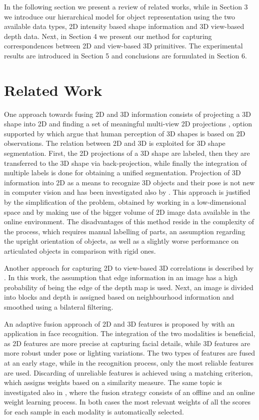 \documentclass[runningheads]{llncs}
\begin{document}
In the following section we present a review of related works, while in Section 3 we introduce our hierarchical model for object representation using the two available data types, 2D intensity based shape information and 3D view-based depth data. Next, in Section 4 we present our method for capturing correspondences between 2D and view-based 3D primitives. The experimental results are introduced in Section 5 and conclusions are formulated in Section 6.

\section{Related Work}
\label{sec:related_work}  

One approach towards fusing 2D and 3D information consists of projecting a 3D shape into 2D and finding a set of meaningful multi-view 2D projections \cite{WangGWC0C13}, option supported by \cite{Fleming2009} which argue that human perception of 3D shapes is based on 2D observations. The relation between 2D and 3D is exploited for 3D shape segmentation. First, the 2D projections of a 3D shape are labeled, then they are transferred to the 3D shape via back-projection, while finally the integration of multiple labels is done for obtaining a unified segmentation. Projection of 3D information into 2D as a means to recognize 3D objects and their pose is not new in computer vision and has been investigated also by \cite{Cyr2001}. This approach is justified by the simplification of the problem, obtained by working in a low-dimensional space and by making use of the bigger volume of 2D image data available in the online environment. The disadvantages of this method reside in the complexity of the process, which requires manual labelling of parts, an assumption regarding the upright orientation of objects, as well as a slightly worse performance on articulated objects in comparison with rigid ones.

Another approach for capturing 2D to view-based 3D correlations is described by \cite{Cheng2010}. In this work, the assumption that edge information in an image has a high probability of being the edge of the depth map is used. Next, an image is divided into blocks and depth is assigned based on neighbourhood information and smoothed using a bilateral filtering. 

An adaptive fusion approach of 2D and 3D features is proposed by \cite{Arca2007} with an application in face recognition. The integration of the two modalities is beneficial, as 2D features are more precise at capturing facial details, while 3D features are more robust under pose or lighting variations. The two types of features are fused at an early stage, while in the recognition process, only the most reliable features are used. Discarding of unreliable features is achieved using a matching criterion, which assigns weights based on a similarity measure. The same topic is investigated also in \cite{Soltana2010}, where the fusion strategy consists of an offline and an online weight learning process. In both cases the most relevant weights of all the scores for each sample in each modality is automatically selected.
\end{document}
